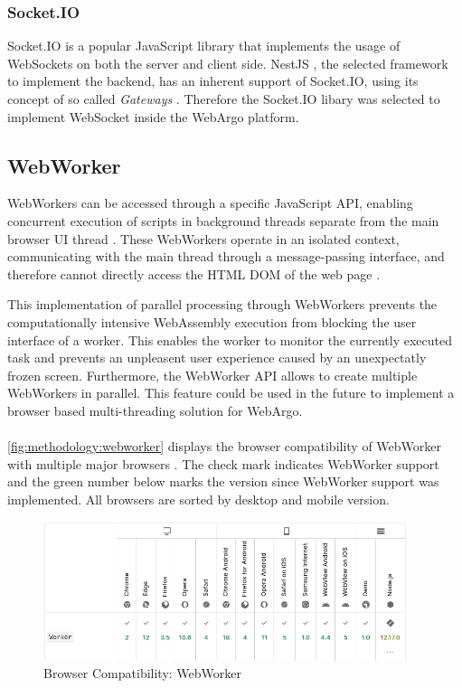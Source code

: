 \subsubsection{Socket.IO}
Socket.IO \cite{methodology:websockets2} is a popular JavaScript library that implements the usage of WebSockets on both the server and client side. NestJS \cite{methodology:nestjs}, the selected framework to implement the backend, has an inherent support of Socket.IO, using its concept of so called \emph{Gateways} \cite{methodology:nestjs}. Therefore the Socket.IO libary was selected to implement WebSocket inside the WebArgo platform.

\subsection{WebWorker}
\label{sec:methodology:webworker}
WebWorkers can be accessed through a specific JavaScript \ac{API}, enabling concurrent execution of scripts in background threads separate from the main browser UI thread \cite{methodology:webworkers}. These WebWorkers operate in an isolated context, communicating with the main thread through a message-passing interface, and therefore cannot directly access the \acs{HTML} \acs{DOM} of the web page \cite{methodology:webworkers}. 

This implementation of parallel processing through WebWorkers prevents the computationally intensive WebAssembly execution from blocking the user interface of a worker. This enables the worker to monitor the currently executed task and prevents an unpleasent user experience caused by an unexpectatly frozen screen. Furthermore, the WebWorker \ac{API} allows to create multiple WebWorkers in parallel. This feature could be used in the future to implement a browser based multi-threading solution for WebArgo.
\\~\\
\autoref{fig:methodology:webworker} displays the browser compatibility of WebWorker with multiple major browsers \cite{methodology:webworkers}. The check mark indicates WebWorker support and the green number below marks the version since WebWorker support was implemented. All browsers are sorted by desktop and mobile version.
\newpage
\begin{figure}[htbp]
  \centering
  \includegraphics[width=0.95\textwidth]{gfx/figures/webworker-browsercompability.png}
  \caption{Browser Compatibility: WebWorker \cite{methodology:webworkers}}
  \label{fig:methodology:webworker}
\end{figure}

